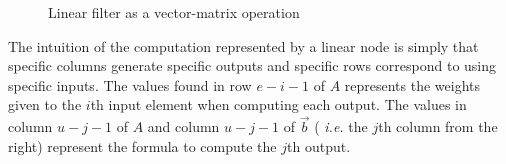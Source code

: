 \begin{figure}[t]
\vspace{-6pt}
\center
\epsfxsize=3.0in
\vspace{-12pt}
\caption{Linear filter as a vector-matrix operation}
\label{fig:overview-matrix}
\vspace{-12pt}
\end{figure}




The intuition of the computation represented by a linear node is
simply that specific columns generate specific outputs and specific
rows correspond to using specific inputs.  The values found in row
$e-i-1$ of $A$ represents the weights given to the $i$th
input element when computing each output.  The values in column
$u-j-1$ of $A$ and column $u-j-1$ of ${\vec b}$ ({\it
i.e.} the $j$th column from the right) represent the formula to
compute the $j$th output.